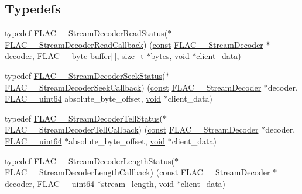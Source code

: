 \subsection*{Typedefs}
\begin{DoxyCompactItemize}
\item 
typedef \hyperlink{group__flac__stream__decoder_gad793ead451206c64a91dc0b851027b93}{F\+L\+A\+C\+\_\+\+\_\+\+Stream\+Decoder\+Read\+Status}($\ast$ \hyperlink{group__flac__stream__decoder_ga25d4321dc2f122d35ddc9061f44beae7}{F\+L\+A\+C\+\_\+\+\_\+\+Stream\+Decoder\+Read\+Callback}) (\hyperlink{getopt1_8c_a2c212835823e3c54a8ab6d95c652660e}{const} \hyperlink{struct_f_l_a_c_____stream_decoder}{F\+L\+A\+C\+\_\+\+\_\+\+Stream\+Decoder} $\ast$decoder, \hyperlink{ordinals_8h_a5eb569b12d5b047cdacada4d57924ee3}{F\+L\+A\+C\+\_\+\+\_\+byte} \hyperlink{structbuffer}{buffer}\mbox{[}$\,$\mbox{]}, size\+\_\+t $\ast$bytes, \hyperlink{sound_8c_ae35f5844602719cf66324f4de2a658b3}{void} $\ast$client\+\_\+data)
\item 
typedef \hyperlink{group__flac__stream__decoder_gac8d269e3c7af1a5889d3bd38409ed67d}{F\+L\+A\+C\+\_\+\+\_\+\+Stream\+Decoder\+Seek\+Status}($\ast$ \hyperlink{group__flac__stream__decoder_ga4c18b0216e0f7a83d7e4e7001230545d}{F\+L\+A\+C\+\_\+\+\_\+\+Stream\+Decoder\+Seek\+Callback}) (\hyperlink{getopt1_8c_a2c212835823e3c54a8ab6d95c652660e}{const} \hyperlink{struct_f_l_a_c_____stream_decoder}{F\+L\+A\+C\+\_\+\+\_\+\+Stream\+Decoder} $\ast$decoder, \hyperlink{ordinals_8h_aa78c8c70a3eb8a58af7436f278acde8e}{F\+L\+A\+C\+\_\+\+\_\+uint64} absolute\+\_\+byte\+\_\+offset, \hyperlink{sound_8c_ae35f5844602719cf66324f4de2a658b3}{void} $\ast$client\+\_\+data)
\item 
typedef \hyperlink{group__flac__stream__decoder_ga83708207969383bd7b5c1e9148528845}{F\+L\+A\+C\+\_\+\+\_\+\+Stream\+Decoder\+Tell\+Status}($\ast$ \hyperlink{group__flac__stream__decoder_gafdf1852486617a40c285c0d76d451a5a}{F\+L\+A\+C\+\_\+\+\_\+\+Stream\+Decoder\+Tell\+Callback}) (\hyperlink{getopt1_8c_a2c212835823e3c54a8ab6d95c652660e}{const} \hyperlink{struct_f_l_a_c_____stream_decoder}{F\+L\+A\+C\+\_\+\+\_\+\+Stream\+Decoder} $\ast$decoder, \hyperlink{ordinals_8h_aa78c8c70a3eb8a58af7436f278acde8e}{F\+L\+A\+C\+\_\+\+\_\+uint64} $\ast$absolute\+\_\+byte\+\_\+offset, \hyperlink{sound_8c_ae35f5844602719cf66324f4de2a658b3}{void} $\ast$client\+\_\+data)
\item 
typedef \hyperlink{group__flac__stream__decoder_gad5860157c2bb34501b8b9370472d727a}{F\+L\+A\+C\+\_\+\+\_\+\+Stream\+Decoder\+Length\+Status}($\ast$ \hyperlink{group__flac__stream__decoder_ga5363f3b46e3f7d6a73385f6560f7e7ef}{F\+L\+A\+C\+\_\+\+\_\+\+Stream\+Decoder\+Length\+Callback}) (\hyperlink{getopt1_8c_a2c212835823e3c54a8ab6d95c652660e}{const} \hyperlink{struct_f_l_a_c_____stream_decoder}{F\+L\+A\+C\+\_\+\+\_\+\+Stream\+Decoder} $\ast$decoder, \hyperlink{ordinals_8h_aa78c8c70a3eb8a58af7436f278acde8e}{F\+L\+A\+C\+\_\+\+\_\+uint64} $\ast$stream\+\_\+length, \hyperlink{sound_8c_ae35f5844602719cf66324f4de2a658b3}{void} $\ast$client\+\_\+data)

\end{DoxyCompactItemize}
